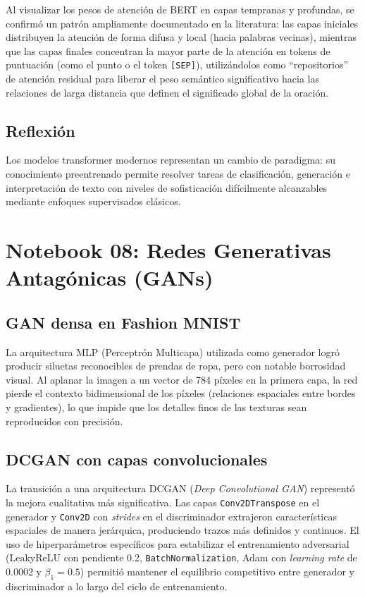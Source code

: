 \documentclass[12pt, a4paper]{article}
\begin{document}
Al visualizar los pesos de atención de BERT en capas tempranas y profundas, se confirmó un patrón ampliamente documentado en la literatura: las capas iniciales distribuyen la atención de forma difusa y local (hacia palabras vecinas), mientras que las capas finales concentran la mayor parte de la atención en tokens de puntuación (como el punto o el token \texttt{[SEP]}), utilizándolos como ``repositorios'' de atención residual para liberar el peso semántico significativo hacia las relaciones de larga distancia que definen el significado global de la oración.

\subsection{Reflexión}

Los modelos transformer modernos representan un cambio de paradigma: su conocimiento preentrenado permite resolver tareas de clasificación, generación e interpretación de texto con niveles de sofisticación difícilmente alcanzables mediante enfoques supervisados clásicos.

\section{Notebook 08: Redes Generativas Antagónicas (GANs)}

\subsection{GAN densa en Fashion MNIST}

La arquitectura MLP (Perceptrón Multicapa) utilizada como generador logró producir siluetas reconocibles de prendas de ropa, pero con notable borrosidad visual. Al aplanar la imagen a un vector de 784 píxeles en la primera capa, la red pierde el contexto bidimensional de los píxeles (relaciones espaciales entre bordes y gradientes), lo que impide que los detalles finos de las texturas sean reproducidos con precisión.

\subsection{DCGAN con capas convolucionales}

La transición a una arquitectura DCGAN (\textit{Deep Convolutional GAN}) representó la mejora cualitativa más significativa. Las capas \texttt{Conv2DTranspose} en el generador y \texttt{Conv2D} con \textit{strides} en el discriminador extrajeron características espaciales de manera jerárquica, produciendo trazos más definidos y continuos. El uso de hiperparámetros específicos para estabilizar el entrenamiento adversarial (LeakyReLU con pendiente 0.2, \texttt{BatchNormalization}, Adam con \textit{learning rate} de 0.0002 y $\beta_1 = 0.5$) permitió mantener el equilibrio competitivo entre generador y discriminador a lo largo del ciclo de entrenamiento.
\end{document}
